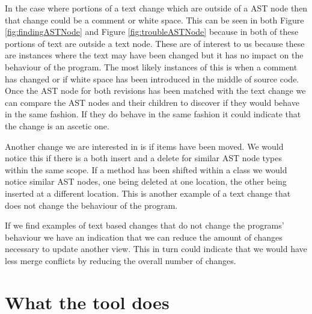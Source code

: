 In the case where portions of a text change which are outside of a AST node then that change could be a comment or white space. This can be seen in both Figure \ref{fig:findingASTNode} and Figure \ref{fig:troubleASTNode} because in both of these portions of text are outside a text node.  These are of interest to us because these are instances where the text may have been changed but it has no impact on the behaviour of the program.  The most likely instances of this is when a comment has changed or if white space has been introduced in the middle of source code. Once the AST node for both revisions has been matched with the text change we can compare the AST nodes and their children to discover if they would behave in the same fashion. If they do behave in the same fashion it could indicate that the change is an ascetic one.

Another change we are interested in is if items have been moved.  We would notice this if there is a both insert and a delete for similar AST node types within the same scope.  If a method has been shifted within a class we would notice similar AST nodes, one being deleted at one location, the other being inserted at a different location.  This is another example of a text change that does not change the behaviour of the program.


If we find examples of text based changes that do not change the programs' behaviour we have an indication that we can reduce the amount of changes necessary to update another view. This in turn could indicate that we would have less merge conflicts by reducing the overall number of changes.

% 

\section{What the tool does}


